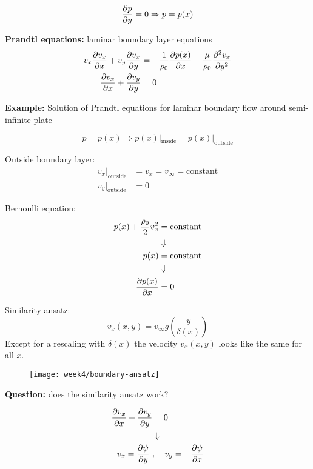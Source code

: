 \begin{equation}
\frac{\partial p}{\partial y} = 0 \Rightarrow p = p(x)
\end{equation}


\textbf{Prandtl equations:} laminar boundary layer equations
\begin{align}
v_x\frac{\partial v_x}{\partial x}+v_y\frac{\partial v_x}{\partial y} &= -\frac{1}{\rho_0}\frac{\partial p(x)}{\partial x}+\frac{\mu}{\rho_0}\frac{\partial^2 v_x}{\partial y^2} \\
\frac{\partial v_x}{\partial x}+\frac{\partial v_y}{\partial y}&=0
\end{align}

\textbf{Example:} Solution of Prandtl equations for laminar boundary flow around semi-infinite plate

\begin{equation}
p=p(x) \Rightarrow p(x)|_\mathrm{inside} = p(x)|_\mathrm{outside}
\end{equation}

Outside boundary layer:
\begin{align}
v_x|_\mathrm{outside} &= v_x = v_\infty = \mathrm{constant} \\
v_y|_\mathrm{outside} &= 0
\end{align}

Bernoulli equation:
\begin{align}
p(x) + \frac{\rho_0}{2}v_x^2 &= \mathrm{constant}\\
&\Downarrow\notag\\
p(x) &= \mathrm{constant} \\
&\Downarrow\notag\\
\frac{\partial p(x)}{\partial x} &= 0
\end{align}

Similarity ansatz:
\begin{equation}
v_x(x,y) = v_\infty g\left(\frac{y}{\delta(x)}\right)
\end{equation}
Except for a rescaling with $\delta(x)$ the velocity $v_x(x,y)$ looks like the same for all $x$.
\begin{figure}[ht]
    \centering
    \texttt{[image: week4/boundary-ansatz]}\\
    \caption{}
    \label{fig:boundary-ansatz}
\end{figure}


\noindent\makebox[\linewidth]{\rule{\textwidth}{0.5pt}}

\textbf{Question:} does the similarity ansatz work?

\begin{align}
\frac{\partial v_x}{\partial x}+\frac{\partial v_y}{\partial y} &= 0 \\
&\Downarrow\notag\\
v_x = \frac{\partial \psi}{\partial y} \ &, \quad v_y = -\frac{\partial \psi}{\partial x}
\end{align}

